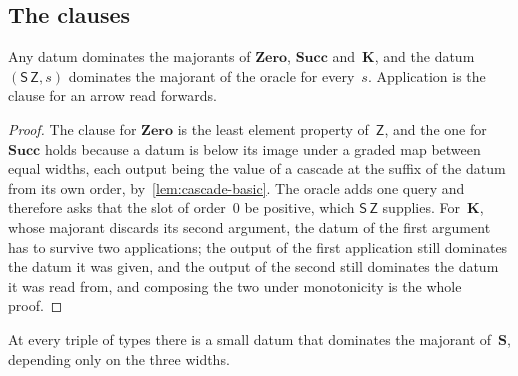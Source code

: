 \documentclass[11pt]{amsart}
\makeatletter
\newcommand{\Kc}{\mathbf{K}}
\newcommand{\Sc}{\mathbf{S}}
\newcommand{\Zeroc}{\mathbf{Zero}}
\newcommand{\Succc}{\mathbf{Succ}}
\newcommand{\bZ}{\mathsf{Z}}
\newcommand{\bS}{\mathsf{S}}
\newif\ifagdarefs
\newcommand{\AgdaRefs}[1]{\ifagdarefs{\footnotesize\color{agdablue}(#1)}\else\unskip\fi}
\newcommand{\Agda}[2]{{\footnotesize\color{agdablue}\textsf{#1}%
  \ifblank{#2}{}{\texttt{.}\allowbreak\texttt{#2}}}}
\let\ttt@plain\texttt
\renewcommand{\texttt}[1]{{\footnotesize\color{agdablue}\ttt@plain{#1}}}
\theoremstyle{plain}
\theoremstyle{definition}
\makeatother
\begin{document}
\subsection{The clauses}
\label{sec:clauses}

\begin{lemma}
\label{lem:easy-clauses}
Any datum dominates the majorants of $\Zeroc$, $\Succc$ and~$\Kc$, and
the datum $(\bS\,\bZ, s)$ dominates the majorant of the oracle for
every~$s$. Application is the clause for an arrow read forwards.
\AgdaRefs{\Agda{DialogueTrees.Predicate}{Zero-clause};
\texttt{Succ-clause}, \texttt{Ω-clause}, \texttt{K-clause},
\texttt{app-clause}.}
\end{lemma}

\begin{proof}
The clause for $\Zeroc$ is the least element property of~$\bZ$, and
the one for $\Succc$ holds because a datum is below its image under a
graded map between equal widths, each output being the value of a
cascade at the suffix of the datum from its own order,
by~\cref{lem:cascade-basic}. The oracle adds one query and therefore
asks that the slot of order~$0$ be positive, which
$\bS\,\bZ$ supplies. For~$\Kc$, whose majorant discards its second
argument, the datum of the first argument has to survive two
applications; the output of the first application still dominates the
datum it was given, and the output of the second still dominates the
datum it was read from, and composing the two under monotonicity is
the whole proof.
\AgdaRefs{\Agda{BrouwerOrdinals.Rect}{rect-increasing};
\texttt{rect-arg-≥}, \texttt{rect-rdOf-≥}.}
\end{proof}

\begin{lemma}[The clause for $\Sc$]
\label{lem:s-clause}
At every triple of types there is a small datum that dominates the
majorant of~$\Sc$, depending only on the three widths.
\AgdaRefs{\Agda{DialogueTrees.SClause}{dS}; \texttt{dS-All<},
\texttt{S-clause}.}
\end{lemma}
\end{document}
